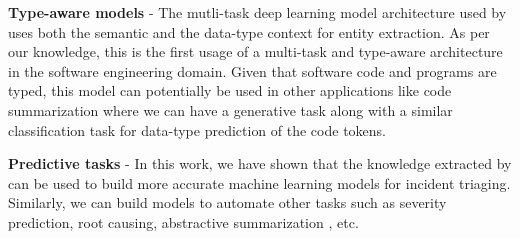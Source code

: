 \textbf{Type-aware models} - The mutli-task deep learning model architecture used by \softner{} uses both the semantic and the data-type context for entity extraction. As per our knowledge, this is the first usage of a multi-task and type-aware architecture in the software engineering domain. Given that software code and programs are typed, this model can potentially be used in other applications like code summarization where we can have a generative task along with a similar classification task for data-type prediction of the code tokens.

\textbf{Predictive tasks} - In this work, we have shown that the knowledge extracted by \softner{} can be used to build more accurate machine learning models for incident triaging. Similarly, we can build models to automate other tasks such as severity prediction, root causing, abstractive summarization \cite{paulus2017deep}, etc.